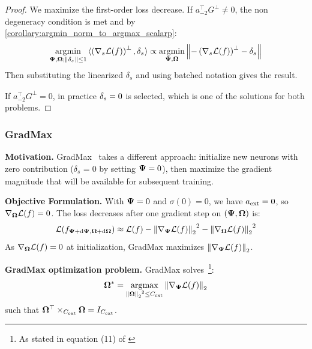 \begin{proof}

We maximize the first-order loss decrease. If $a_{-2}^\top G^\bot \neq 0$, the non degeneracy condition is met and by
\autoref{corollary:argmin_norm_to_argmax_scalarp}:
\[\operatorname*{\arg\!\min}_{\boldsymbol{\Psi}{},\boldsymbol{\Omega}{};\left\| \delta_{s_{}} \right\| \leq 1}{\langle\left( {\nabla_{s_{}}\mathcal{L}(f)} \right)^{\bot},\delta_{s_{}}\rangle} \propto \operatorname*{\arg\!\min}_{\boldsymbol{\Psi}{},\boldsymbol{\Omega}{}}\left\| {- \left( {\nabla_{s_{}}\mathcal{L}(f)} \right)^{\bot} - \delta_{s_{}}} \right\|\]
Then substituting the linearized \(\delta_{s_{}}\) and using batched
notation gives the result.

If $a_{-2}^\top G^\bot = 0$, in practice $\delta_{s} = 0$ is selected, which is one of the solutions for both problems.


\end{proof}

\subsubsection{GradMax}

\textbf{Motivation.} GradMax~\citep{evci_gradmax_2022} takes a different
approach: initialize new neurons with zero contribution
(\(\delta_{s_{}} = 0\) by setting \(\boldsymbol{\Psi}{} = 0\)), then maximize the
gradient magnitude that will be available for subsequent training.

\textbf{Objective Formulation.} With \(\boldsymbol{\Psi}{} = 0\) and \(\sigma(0) = 0\), we have
\(a_{\text{ext}} = 0\), so \(\nabla_{\boldsymbol{\Omega}{}}\mathcal{L}(f) = 0\). The loss
decreases after one gradient step on
\(\left( \boldsymbol{\Psi}{},\boldsymbol{\Omega}{} \right)\) is:
\[\mathcal{L}(f_{\boldsymbol{\Psi}{} + {\mathrm{d}\boldsymbol{\Psi}{}}, \boldsymbol{\Omega}{} + {\mathrm{d}\boldsymbol{\Omega}{}}}) \approx \mathcal{L}(f) - {\left\| {\nabla_{\boldsymbol{\Psi}{}}\mathcal{L}(f)} \right\|_{2}}^{2} - {\left\| {\nabla_{\boldsymbol{\Omega}{}}\mathcal{L}(f)} \right\|_{2}}^{2}\]
As \(\nabla_{\boldsymbol{\Omega}{}}\mathcal{L}(f) = 0\) at initialization, GradMax
maximizes \(\left\| {\nabla_{\boldsymbol{\Psi}{}}\mathcal{L}(f)} \right\|_{2}\).

\begin{proposition}

\textbf{GradMax optimization problem.} GradMax solves~\footnote{As stated in equation (11) of \citep{evci_gradmax_2022}}:
\[\boldsymbol{\Omega}{}^{\ast} = \operatorname*{\arg\!\max}_{{\left\| \boldsymbol{\Omega}{} \right\|_{2}}^{2} \leq C_{\text{ext}}}\left\| {\nabla_{\boldsymbol{\Psi}{}}\mathcal{L}(f)} \right\|_{2}\]
such that \(\boldsymbol{\Omega}{}^{\top} \times_{C_{\text{ext}}}\boldsymbol{\Omega}{} = I_{C_{\text{ext}}}\).

\end{proposition}

